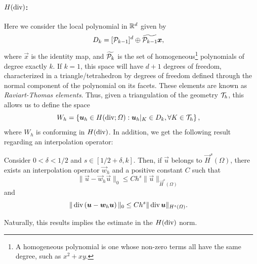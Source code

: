 \paragraph{\texorpdfstring{$H(\dive)$:}{H(div):}} Here we consider the local polynomial in $\R^d$ given by
\begin{equation}
    D_k = [\P_{k-1}]^d \oplus \widetilde{\P_{k-1}} \vec x,
\end{equation}
where $\vec x$ is the identity map, and $\widetilde{\P_k}$ is the set of homogeneous\footnote{A homogeneous polynomial is one whose non-zero terms all have the same degree, such as $x^2 + xy$.} polynomials of degree exactly $k$. If $k=1$, this space will have $d+1$ degrees of freedom, characterized in a triangle/tetrahedron by degrees of freedom defined through the normal component of the polynomial on its facets. These elements are known as \emph{Raviart-Thomas elements}. Thus, given a triangulation of the geometry $\T_h$, this allows us to define the space
\begin{equation}
    W_h = \left\{ \vec u_h \in H(\dive; \Omega):  \vec u_h|_K \in D_k , \forall K \in \T_h \right\},
\end{equation}
where $W_h$ is conforming in $H(\dive)$. In addition, we get the following result regarding an interpolation operator: 
\begin{theorem}\label{thm:Hdiv-interpolation}
    Consider $0<\delta<1/2$ and $s\in [1/2+\delta, k]$. Then, if $\vec u$ belongs to $\vec H^s(\Omega)$, there exists an interpolation operator $\vec w_h$ and a positive constant $C$ such that
    \begin{equation}
        \|\vec u - \vec w_h \vec u\|_0 \leq C h^s \| \vec u \|_{\vec H^s(\Omega)}
    \end{equation}
    and 
    \begin{equation}
        \|\dive\left(\vec u - \vec w_h \vec u\right)\|_0 \leq C h^s \| \dive \vec u \|_{H^s(\Omega)}.
    \end{equation}
\end{theorem}

Naturally, this results implies the estimate in the $H(\dive)$ norm. 
